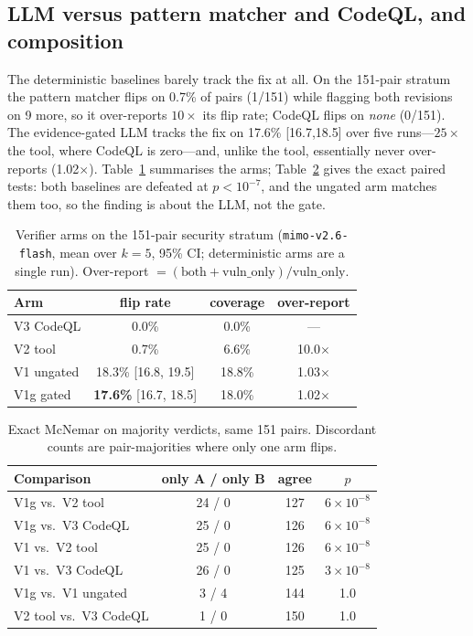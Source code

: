 \documentclass[conference]{IEEEtran}
\newcommand{\code}[1]{\texttt{#1}}
\begin{document}
\subsection{LLM versus pattern matcher and CodeQL, and composition}
The deterministic baselines barely track the fix at all. On the 151-pair stratum
the pattern matcher flips on 0.7\% of pairs (1/151) while flagging both
revisions on 9 more, so it over-reports $10\times$ its flip rate; CodeQL flips on
\emph{none} (0/151). The evidence-gated LLM tracks the fix on 17.6\%
[16.7,18.5] over five runs---$25\times$ the tool, where CodeQL is zero---and,
unlike the tool, essentially never over-reports (1.02$\times$).
Table~\ref{tab:arms} summarises the arms;
Table~\ref{tab:mcnemar} gives the exact paired tests: both baselines are
defeated at $p{<}10^{-7}$, and the ungated arm matches them
too, so the finding is about the LLM, not the gate.

\begin{table}[t]
\centering
\caption{Verifier arms on the 151-pair security stratum
(\code{mimo-v2.6-flash}, mean over $k{=}5$, 95\% CI; deterministic arms are a
single run). Over-report $=(\text{both}+\text{vuln\_only})/\text{vuln\_only}$.}
\label{tab:arms}
\scriptsize
\begin{tabular}{@{}lccc@{}}
\toprule
Arm & flip rate & coverage & over-report \\
\midrule
V3 CodeQL & 0.0\% & 0.0\% & --- \\
V2 tool & 0.7\% & 6.6\% & 10.0$\times$ \\
V1 ungated & 18.3\% [16.8, 19.5] & 18.8\% & 1.03$\times$ \\
V1g gated & \textbf{17.6\%} [16.7, 18.5] & 18.0\% & 1.02$\times$ \\\bottomrule
\end{tabular}
\end{table}

\begin{table}[t]
\centering
\caption{Exact McNemar on majority verdicts, same 151 pairs. Discordant counts
are pair-majorities where only one arm flips.}
\label{tab:mcnemar}
\small
\begin{tabular}{@{}lccc@{}}
\toprule
Comparison & only A / only B & agree & $p$ \\
\midrule
V1g vs.\ V2 tool & 24 / 0 & 127 & $6\times10^{-8}$ \\
V1g vs.\ V3 CodeQL & 25 / 0 & 126 & $6\times10^{-8}$ \\
V1 vs.\ V2 tool & 25 / 0 & 126 & $6\times10^{-8}$ \\
V1 vs.\ V3 CodeQL & 26 / 0 & 125 & $3\times10^{-8}$ \\
V1g vs.\ V1 ungated & 3 / 4 & 144 & 1.0 \\
V2 tool vs.\ V3 CodeQL & 1 / 0 & 150 & 1.0 \\
\bottomrule
\end{tabular}
\end{table}
\end{document}
